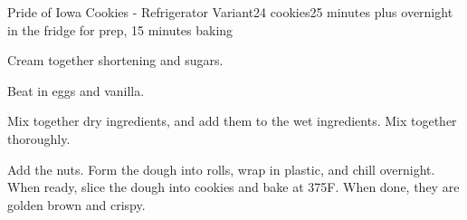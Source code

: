 \documentclass[../Cookbook.tex]{subfiles}
\begin{document}
\begin{recipe}{Pride of Iowa Cookies - Refrigerator Variant}{24 cookies}{25 minutes plus overnight in the fridge for prep, 15 minutes baking}

	Cream together shortening and sugars.

	Beat in eggs and vanilla.

	Mix together dry ingredients, and add them to the wet ingredients. Mix together thoroughly.

	Add the nuts. Form the dough into rolls, wrap in plastic, and chill overnight.\\
	When ready, slice the dough into cookies and bake at 375\0F. When done, they are golden brown and crispy.

\end{recipe}
\end{document}
